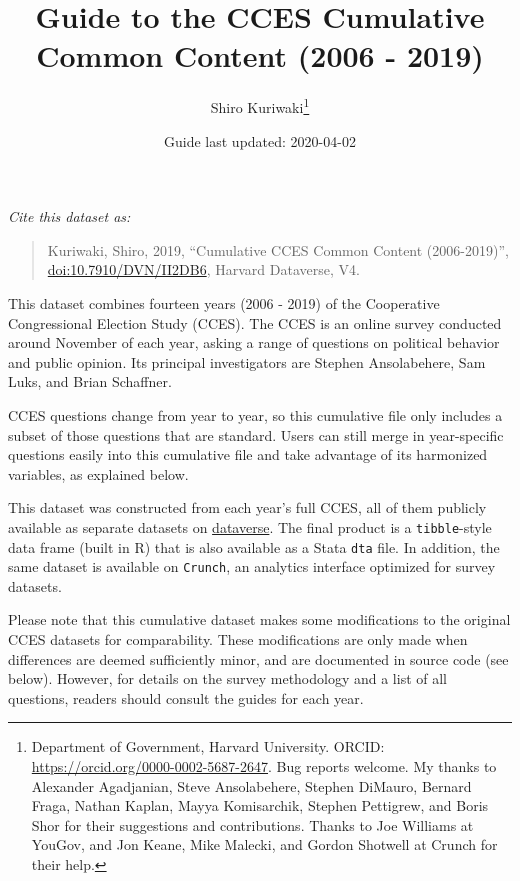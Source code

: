 \documentclass[10pt,article,oneside]{memoir}
\title{ \LARGE\textbf{Guide to the CCES Cumulative Common Content (2006
- 2019)}}
\author{Shiro Kuriwaki\thanks{Department of Government, Harvard
University. ORCID: \url{https://orcid.org/0000-0002-5687-2647}. Bug
reports welcome. My thanks to Alexander Agadjanian, Steve Ansolabehere,
Stephen DiMauro, Bernard Fraga, Nathan Kaplan, Mayya Komisarchik,
Stephen Pettigrew, and Boris Shor for their suggestions and
contributions. Thanks to Joe Williams at YouGov, and Jon Keane, Mike
Malecki, and Gordon Shotwell at Crunch for their help.}  }
\date{Guide last updated: 2020-04-02}
\theoremstyle{definition}
\begin{document}
\maketitle





\renewcommand\UrlFont{\color{crimson}\ttfamily}

\noindent \emph{Cite this dataset as:}

\begin{quote}
Kuriwaki, Shiro, 2019, ``Cumulative CCES Common Content (2006-2019)'',
\href{https://dataverse.harvard.edu/dataset.xhtml?persistentId=doi:10.7910/DVN/II2DB6}{\url{doi:10.7910/DVN/II2DB6}},
Harvard Dataverse, V4.
\end{quote}

\bigskip

This dataset combines fourteen years (2006 - 2019) of the Cooperative
Congressional Election Study (CCES). The CCES is an online survey
conducted around November of each year, asking a range of questions on
political behavior and public opinion. Its principal investigators are
Stephen Ansolabehere, Sam Luks, and Brian Schaffner.

\bigskip

CCES questions change from year to year, so this cumulative file only
includes a subset of those questions that are standard. Users can still
merge in year-specific questions easily into this cumulative file and
take advantage of its harmonized variables, as explained below.

\bigskip

This dataset was constructed from each year's full CCES, all of them
publicly available as separate datasets on
\href{cces.gov.harvard.edu}{dataverse}. The final product is a
\texttt{tibble}-style data frame (built in R) that is also available as
a Stata \texttt{dta} file. In addition, the same dataset is available on
\texttt{Crunch}, an analytics interface optimized for survey datasets.

\bigskip

Please note that this cumulative dataset makes some modifications to the
original CCES datasets for comparability. These modifications are only
made when differences are deemed sufficiently minor, and are documented
in source code (see below). However, for details on the survey
methodology and a list of all questions, readers should consult the
guides for each year.

\vspace{1cm}
\end{document}

